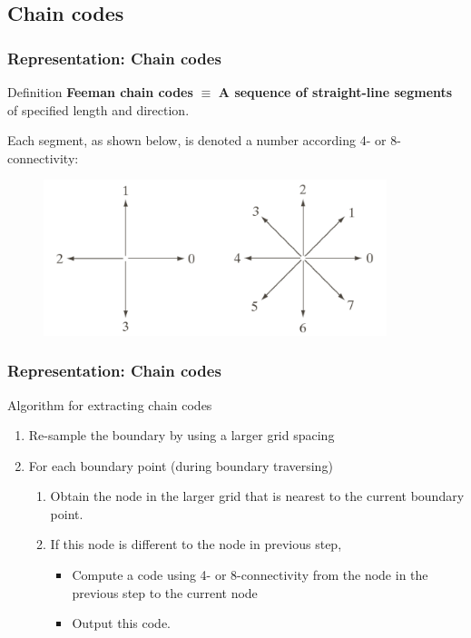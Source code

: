 \documentclass[english,11pt,table,handout]{beamer}
\begin{document}
\subsection{Chain codes}
\frame
{
	\frametitle{Representation: Chain codes}
	\begin{block}{Definition}
		\textbf{\alert{Feeman chain codes}} $\equiv$ \textbf{\alert{A sequence of straight-line segments}} of specified length and direction.
	\end{block}
	Each segment, as shown below,  is denoted a number according 4- or 8-connectivity:
	\begin{figure}[!h]
		\includegraphics[width=10cm]{chaincode_1.png}
	\end{figure}
}
\frame
{
	\frametitle{Representation: Chain codes}
	\begin{block}{Algorithm for extracting chain codes}
		\begin{enumerate}
			\item Re-sample the boundary by using a larger grid spacing
			\item For each boundary point (during boundary traversing)
			\begin{enumerate}
				\item Obtain the node in the larger grid that is nearest to the current boundary point.
				\item If this node is different to the node in previous step,
				\begin{itemize}
					\item Compute a code using 4- or 8-connectivity from the node in the previous step to the current node
					\item Output this code.
				\end{itemize}
			\end{enumerate}
		
		\end{enumerate}
	\end{block}

}
\end{document}
